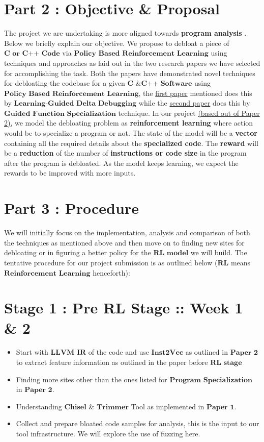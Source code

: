 \documentclass{article} %
\begin{document}
\section*{Part 2 : Objective \& Proposal}
The project we are undertaking is more aligned towards \color{blue} \textbf{program analysis} \color{black}. Below we briefly explain our objective. 
We propose to debloat a piece of $\textbf{C or C++ Code}$ via $\textbf{Policy Based Reinforcement Learning}$ using techniques and approaches as laid out in the two research papers we have selected for accomplishing the task. Both the papers have demonstrated novel techniques for debloating the codebase for a given $\textbf{C \& C++ Software}$ using $\textbf{Policy Based Reinforcement Learning}$, the \href{https://dl.acm.org/doi/10.1145/3243734.3243838}{first paper} mentioned does this by $\textbf{Learning-Guided Delta Debugging}$  while the \href{http://www.csl.sri.com/users/gehani/papers/MLSys-2019.DeepOCCAM.pdf}{second paper} does this by $\textbf{Guided Function Specialization}$ technique. In our project \href{http://www.csl.sri.com/users/gehani/papers/MLSys-2019.DeepOCCAM.pdf}{(based out of Paper 2)}, we model the debloating problem as \textbf{reinforcement learning} where action would be to specialize a program or not. The state of the model will be a \textbf{vector} containing all the required details about the \textbf{specialized code}. The \textbf{reward} will be a \textbf{reduction} of the number of \textbf{instructions or code size} in the program after the program is debloated. As the model keeps learning, we expect the rewards to be improved with more inputs. 

\section*{Part 3 : Procedure}
We will initially focus on the implementation, analysis and comparison of both the techniques as mentioned above and then move on to finding new sites for debloating or in figuring a better policy for the $\textbf{RL model}$ we will build. The tentative procedure for our project submission is as outlined below ($\textbf{RL}$ means $\textbf{Reinforcement Learning}$ henceforth):
\section*{Stage 1 : Pre RL Stage :: Week 1 \& 2}
\begin{itemize}
    \item Start with $\textbf{LLVM IR}$ of the code and use $\textbf{Inst2Vec}$ as outlined in $\textbf{Paper 2}$ to extract feature information as outlined in the paper before $\textbf{RL stage}$
    \item Finding more sites other than the ones listed for $\textbf{Program Specialization}$ in $\textbf{Paper 2}$.  
    \item Understanding $\textbf{Chisel}$ \& $\textbf{Trimmer}$ Tool as implemented in $\textbf{Paper 1}$.
    \item Collect and prepare bloated code samples for analysis, this is the input to our tool infrastructure. We will explore the use of fuzzing here.  
\end{itemize}
\end{document}
